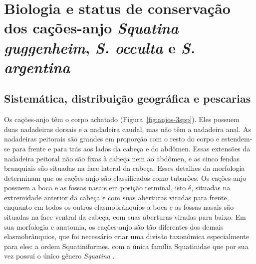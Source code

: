 \documentclass[a4paper,11pt,twoside,showtrims,onecolumn,openright,final]{memoir}
\begin{document}

\chapter[Biologia e status de conservação dos cações-anjo \newline
         \emph{Squatina guggenheim}, \emph{S. occulta} e \emph{S. argentina}]
        {Biologia e status de conservação dos cações-anjo \emph{Squatina guggenheim},
	 \emph{S. occulta} e \emph{S. argentina}}\label{chap:anjos}





\newpage

\section*{Sistemática, distribuição geográfica e pescarias}

Os cações-anjo têm o corpo achatado (Figura~\ref{fig:anjos-3spp}). %
Eles possuem duas nadadeiras dorsais e a nadadeira caudal, mas não têm a nadadeira anal. 
As nadadeiras peitorais são grandes em proporção com o resto do corpo e estendem-se para 
frente e para trás aos lados da cabeça e do abdômen. Essas extensões da nadadeira peitoral 
não são fixas à cabeça nem ao abdômen, e as cinco fendas branquiais são situadas na face 
lateral da cabeça. Esses detalhes da morfologia determinam que os cações-anjo são 
classificados como tubarões. Os cações-anjo possuem a boca e as fossas nasais em posição 
terminal, isto é, situadas na extremidade anterior da cabeça e com suas aberturas viradas 
para frente, enquanto em todos os outros elasmobrânquios a boca e as fossas nasais são 
situadas na face ventral da cabeça, com suas aberturas viradas para baixo. 
Em sua morfologia e anatomia, os cações-anjo são tão diferentes dos demais elasmobrânquios, 
que foi necessário criar uma divisão taxonômica especialmente para eles:  
a ordem Squatiniformes, com a única família Squatinidae que por sua vez possui 
o único gênero \emph{Squatina} \citep{compagno2005}. %
\end{document}
